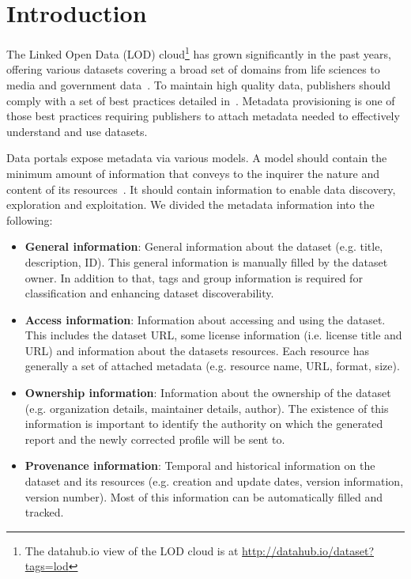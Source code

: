 \documentclass[runningheads,a4paper]{../../Util/LaTEX/llncs}
\begin{document}
\section{Introduction}
\label{sec:introduction}
The Linked Open Data (LOD) cloud\footnote{The datahub.io view of the LOD cloud is at \url{http://datahub.io/dataset?tags=lod}} has grown significantly in the past years, offering various datasets covering a broad set of domains from life sciences to media and government data~\cite{Bizer:IJSWIS:09}. To maintain high quality data, publishers should comply with a set of best practices detailed in~\cite{Bizer:DB:11}. Metadata provisioning is one of those best practices requiring publishers to attach metadata needed to effectively understand and use datasets.

Data portals expose metadata via various models. A model should contain the minimum amount of information that conveys to the inquirer the nature and content of its resources~\cite{Nebert:GSDI:04}. It should contain information to enable data discovery, exploration and exploitation. We divided the metadata information into the following:
\begin{itemize}
 \item \textbf{General information}: General information about the dataset (e.g. title, description, ID). This general information is manually filled by the dataset owner. In addition to that, tags and group information is required for classification and enhancing dataset discoverability.
 \item \textbf{Access information}: Information about accessing and using the dataset. This includes the dataset URL, some license information (i.e. license title and URL) and information about the datasets resources. Each resource has generally a set of attached metadata (e.g. resource name, URL, format, size).
 \item \textbf{Ownership information}: Information about the ownership of the dataset (e.g. organization details, maintainer details, author). The existence of this information is important to identify the authority on which the generated report and the newly corrected profile will be sent to.
 \item \textbf{Provenance information}: Temporal and historical information on the dataset and its resources (e.g. creation and update dates, version information, version number). Most of this information can be automatically filled and tracked.
\end{itemize}
\end{document}
